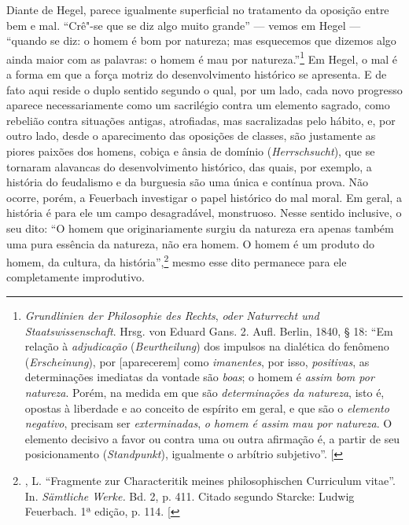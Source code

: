 Diante de
 Hegel,
parece igualmente superficial no tratamento da oposição entre bem e mal.
``Crê"-se que se diz algo muito grande'' --- vemos
em Hegel ---
``quando se diz: o homem é bom por natureza; mas esquecemos que dizemos
algo ainda maior com as palavras: o homem é mau por natureza.''\footnote{\emph{Grundlinien der Philosophie des Rechts},
  \emph{oder Naturrecht und Staatswissenschaft}. Hrsg. von Eduard Gans.
  2. Aufl. Berlin, 1840, § 18: ``Em relação à \emph{adjudicação}
  (\emph{Beurtheilung}) dos impulsos na dialética do fenômeno
  (\emph{Erscheinung}), por {[}aparecerem{]} como \emph{imanentes}, por
  isso, \emph{positivas}, as determinações imediatas da vontade são
  \emph{boas}; o homem é \emph{assim bom por natureza}. Porém, na medida
  em que são \emph{determinações da natureza}, isto é, opostas à
  liberdade e ao conceito de espírito em geral, e que são o
  \emph{elemento negativo}, precisam ser \emph{exterminadas}, \emph{o
  homem é assim mau por natureza}. O elemento decisivo a favor ou contra
  uma ou outra afirmação é, a partir de seu posicionamento
  (\emph{Standpunkt}), igualmente o arbítrio subjetivo''. {[}\versal{N.\,T.}{]}}
Em Hegel,
o mal é a forma em que a força motriz do desenvolvimento histórico se
apresenta. E de fato aqui reside o duplo sentido segundo o qual, por um
lado, cada novo progresso aparece necessariamente como um sacrilégio
contra um elemento sagrado, como rebelião contra situações antigas,
atrofiadas, mas sacralizadas pelo hábito, e, por outro lado, desde o
aparecimento das oposições de classes, são justamente as piores paixões
dos homens, cobiça e ânsia de domínio (\emph{Herrschsucht}), que se
tornaram alavancas do desenvolvimento histórico, das quais, por exemplo,
a história do feudalismo e da burguesia são uma única e contínua prova.
Não ocorre, porém, a
Feuerbach 
investigar o papel histórico do mal moral. Em geral, a história é para
ele um campo desagradável, monstruoso. Nesse sentido inclusive, o seu
dito: ``O homem que originariamente surgiu da natureza era apenas também
uma pura essência da natureza, não era homem. O homem é um produto do
homem, da cultura, da história'',\footnote{, L. ``Fragmente zur Characteritik meines philosophischen
  Curriculum vitae''. In. \emph{Sämtliche Werke.} Bd. 2, p. 411. Citado
  segundo Starcke: Ludwig Feuerbach. 1ª edição, p. 114. {[}\versal{N.\,T.}{]}} mesmo esse
dito permanece para ele completamente improdutivo.

